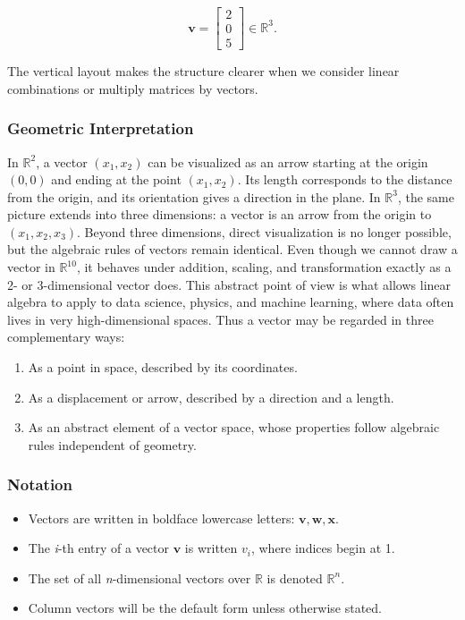 \documentclass[
  12pt,
  a4paper,
]{article}
\begin{document}
\[\mathbf{v} = \begin{bmatrix} 2 \\ 0 \\ 5 \end{bmatrix} \in \mathbb{R}^3.\]

The vertical layout makes the structure clearer when we consider linear
combinations or multiply matrices by vectors.

\subsubsection{Geometric Interpretation}\label{geometric-interpretation}

In \(\mathbb{R}^2\), a vector \((x_1, x_2)\) can be visualized as an
arrow starting at the origin \((0,0)\) and ending at the point
\((x_1, x_2)\). Its length corresponds to the distance from the origin,
and its orientation gives a direction in the plane. In \(\mathbb{R}^3\),
the same picture extends into three dimensions: a vector is an arrow
from the origin to \((x_1, x_2, x_3)\). Beyond three dimensions, direct
visualization is no longer possible, but the algebraic rules of vectors
remain identical. Even though we cannot draw a vector in
\(\mathbb{R}^{10}\), it behaves under addition, scaling, and
transformation exactly as a 2- or 3-dimensional vector does. This
abstract point of view is what allows linear algebra to apply to data
science, physics, and machine learning, where data often lives in very
high-dimensional spaces. Thus a vector may be regarded in three
complementary ways:

\begin{enumerate}
\def\labelenumi{\arabic{enumi}.}
\item
  As a point in space, described by its coordinates.
\item
  As a displacement or arrow, described by a direction and a length.
\item
  As an abstract element of a vector space, whose properties follow
  algebraic rules independent of geometry.
\end{enumerate}

\subsubsection{Notation}\label{notation}

\begin{itemize}
\item
  Vectors are written in boldface lowercase letters:
  \(\mathbf{v}, \mathbf{w}, \mathbf{x}\).
\item
  The \emph{i}-th entry of a vector \(\mathbf{v}\) is written \(v_i\),
  where indices begin at 1.
\item
  The set of all \emph{n}-dimensional vectors over \(\mathbb{R}\) is
  denoted \(\mathbb{R}^n\).
\item
  Column vectors will be the default form unless otherwise stated.
\end{itemize}
\end{document}
